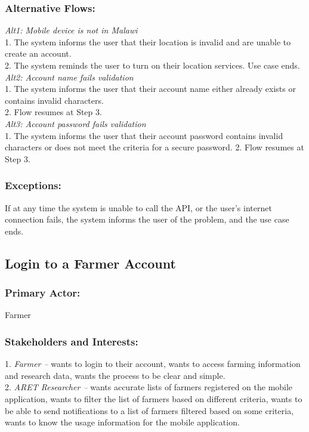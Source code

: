 \documentclass[12pt,letterpaper]{article}
\begin{document}
\subsubsection*{Alternative Flows:}
\emph{Alt1: Mobile device is not in Malawi}\\
1.  The system informs the user that their location is invalid and are unable to create an account. \\
2. The system reminds the user to turn on their location services. Use case ends.\\[10pt]
\emph{Alt2: Account name fails validation}\\
1. The system informs the user that their account name either already exists or contains invalid characters. \\
2. Flow resumes at Step 3. \\[10pt]
\emph{Alt3:  Account password fails validation}\\
1. The system informs the user that their account password contains invalid characters or does not meet the criteria for a secure password.
2. Flow resumes at Step 3.

\subsubsection*{Exceptions:}
If at any time the system is unable to call the API, or the user’s internet connection fails, the system informs the user of the problem, and the use case ends.

\clearpage
\subsection{Login to a Farmer Account}
\subsubsection*{Primary Actor:} Farmer
\subsubsection*{Stakeholders and Interests:}
1. \emph{Farmer --} wants to login to their account, wants to access farming information and research data, wants the process to be clear and simple. \\[10pt]
2. \emph{ARET Researcher --} wants accurate lists of farmers registered on the mobile application, wants to filter the list of farmers based on different criteria, wants to be able to send notifications to a list of farmers filtered based on some criteria, wants to know the usage information for the mobile application.
\end{document}
